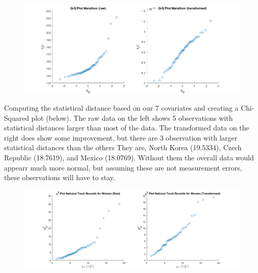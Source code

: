 \begin{center}
    \begin{figure}[H]
        \centering
        \includegraphics[scale=0.4]{./matlab/chapter-4/sol4.36.qq.7.png}
    \end{figure}
\end{center}

Computing the statistical distance based on our 7 covariates and creating a Chi-Squared plot (below). The raw data on the left  shows 5 observations with statistical distances larger than most of the data. The transformed data on the right does show some improvement, but there are 3 observation with larger statistical distances than the others They are, North Korea (19.5334), Czech Republic (18.7619), and Mexico (18.0769). Without them the overall data would appearr much more normal, but assuming these are not measurement errors, these observations will have to stay.

\begin{center}
    \begin{figure}[H]
        \centering
        \includegraphics[scale=0.4]{./matlab/chapter-4/sol4.36.chi2.png}
    \end{figure}
\end{center}



